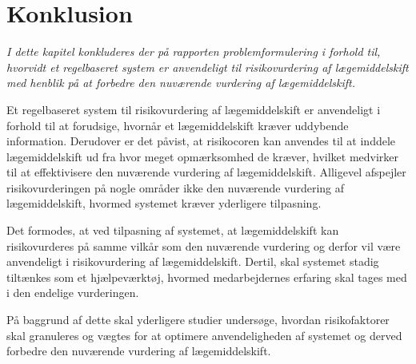 \chapter{Konklusion}
\textit{I dette kapitel konkluderes der på rapporten problemformulering i forhold til, hvorvidt et regelbaseret system er anvendeligt til risikovurdering af lægemiddelskift med henblik på at forbedre den nuværende vurdering af lægemiddelskift.}

Et regelbaseret system til risikovurdering af lægemiddelskift er anvendeligt i forhold til at forudsige, hvornår et lægemiddelskift kræver uddybende information. Derudover er det påvist, at risikocoren kan anvendes til at inddele lægemiddelskift ud fra hvor meget opmærksomhed de kræver, hvilket medvirker til at effektivisere den nuværende vurdering af lægemiddelskift.
Alligevel afspejler risikovurderingen på nogle områder ikke den nuværende vurdering af lægemiddelskift, hvormed systemet kræver yderligere tilpasning.

Det formodes, at ved tilpasning af systemet, at lægemiddelskift kan risikovurderes på samme vilkår som den nuværende vurdering og derfor vil være anvendeligt i risikovurdering af lægemiddelskift. Dertil, skal systemet stadig tiltænkes som et hjælpeværktøj, hvormed medarbejdernes erfaring skal tages med i den endelige vurderingen. 

På baggrund af dette skal yderligere studier undersøge, hvordan risikofaktorer skal granuleres og vægtes for at optimere anvendeligheden af systemet og derved forbedre den nuværende vurdering af lægemiddelskift.
